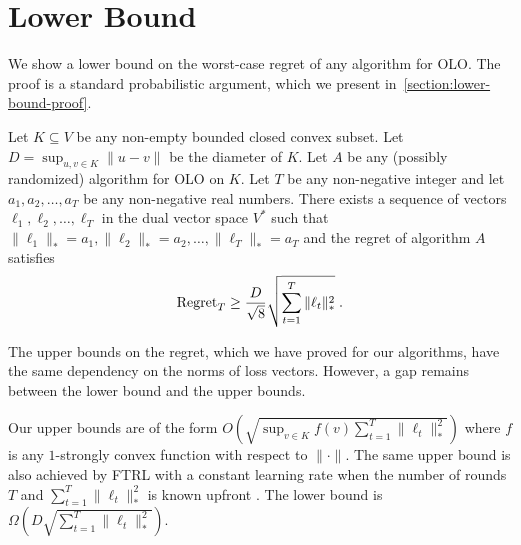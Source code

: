 \section{Lower Bound}
\label{section:lower-bound}

We show a lower bound on the worst-case regret of any algorithm for OLO. The
proof is a standard probabilistic argument, which we present
in~\ref{section:lower-bound-proof}.

\begin{theorem}
\label{theorem:simple-lower-bound}
Let $K \subseteq V$ be any non-empty bounded closed convex subset. Let $D =
\sup_{u,v \in K} \|u - v\|$ be the diameter of $K$. Let $A$ be any (possibly
randomized) algorithm for OLO on $K$. Let $T$ be any non-negative integer and
let $a_1, a_2, \dots, a_T$ be any non-negative real numbers.  There exists a
sequence of vectors $\ell_1, \ell_2, \dots, \ell_T$ in the dual vector space
$V^*$ such that $\|\ell_1\|_* = a_1, \|\ell_2\|_* = a_2, \dots, \|\ell_T\|_* =
a_T$ and the regret of algorithm $A$ satisfies
\begin{equation}
\label{equation:simple-lower-bound}
\operatorname{Regret}_T \ge \frac{D}{\sqrt{8}} \sqrt{\sum_{t=1}^T\|\ell_t\|_*^2} \; .
\end{equation}
\end{theorem}

The upper bounds on the regret, which we have proved for our algorithms, have
the same dependency on the norms of loss vectors.  However, a gap remains
between the lower bound and the upper bounds.

Our upper bounds are of the form $O(\sqrt{\sup_{v \in K} f(v) \sum_{t=1}^T
\|\ell_t\|_*^2})$ where $f$ is any $1$-strongly convex function with respect to
$\|\cdot\|$.  The same upper bound is also achieved by FTRL with a constant
learning rate when the number of rounds $T$ and $\sum_{t=1}^T \|\ell_t\|_*^2$
is known upfront \cite[Chapter 2]{Shalev-Shwartz-2011}.  The lower bound is
$\Omega(D\sqrt{\sum_{t=1}^T \|\ell_t\|_*^2})$.

